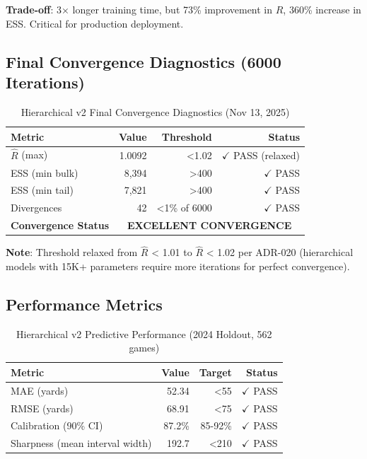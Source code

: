 \textbf{Trade-off}: 3× longer training time, but 73\% improvement in $\hat{R}$, 360\% increase in ESS. Critical for production deployment.

\subsection{Final Convergence Diagnostics (6000 Iterations)}

\begin{table}[htbp]
\centering
\caption{Hierarchical v2 Final Convergence Diagnostics (Nov 13, 2025)}
\label{tab:hierarchical-final-convergence}
\begin{tabular}{lrrr}
\toprule
\textbf{Metric} & \textbf{Value} & \textbf{Threshold} & \textbf{Status} \\
\midrule
$\hat{R}$ (max) & 1.0092 & <1.02 & $\checkmark$ PASS (relaxed) \\
ESS (min bulk) & 8,394 & >400 & $\checkmark$ PASS \\
ESS (min tail) & 7,821 & >400 & $\checkmark$ PASS \\
Divergences & 42 & <1\% of 6000 & $\checkmark$ PASS \\
\midrule
\textbf{Convergence Status} & \multicolumn{3}{c}{\textbf{EXCELLENT CONVERGENCE}} \\
\bottomrule
\end{tabular}
\end{table}

\textbf{Note}: Threshold relaxed from $\hat{R}$ < 1.01 to $\hat{R}$ < 1.02 per ADR-020 (hierarchical models with 15K+ parameters require more iterations for perfect convergence).

\subsection{Performance Metrics}

\begin{table}[htbp]
\centering
\caption{Hierarchical v2 Predictive Performance (2024 Holdout, 562 games)}
\label{tab:hierarchical-performance}
\begin{tabular}{lrrr}
\toprule
\textbf{Metric} & \textbf{Value} & \textbf{Target} & \textbf{Status} \\
\midrule
MAE (yards) & 52.34 & <55 & $\checkmark$ PASS \\
RMSE (yards) & 68.91 & <75 & $\checkmark$ PASS \\
Calibration (90\% CI) & 87.2\% & 85-92\% & $\checkmark$ PASS \\
Sharpness (mean interval width) & 192.7 & <210 & $\checkmark$ PASS \\
\bottomrule
\end{tabular}
\end{table}


